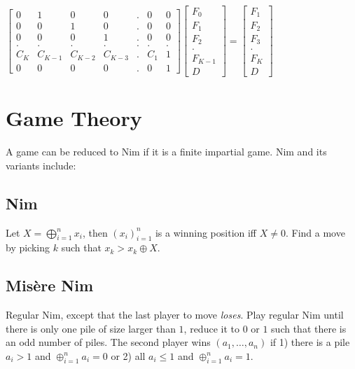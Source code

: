 \begin{enumerate}[label=(\roman*)]
    {
  \scriptsize
  $\begin{bmatrix}
    0 & 1 & 0 & 0 & . & 0 & 0\\
    0 & 0 & 1 & 0 & . & 0 & 0\\
    0 & 0 & 0 & 1 & . & 0 & 0\\
    . & . & . & . & . & . & .\\
    C_K & C_{K-1} & C_{K-2} & C_{K-3} & . & C_{1} & 1\\
    0 & 0 & 0 & 0 & . & 0 & 1
  \end{bmatrix} 
  \begin{bmatrix}
  F_0\\
  F_1\\
  F_2\\
  .\\
  F_{K-1}\\
  D
  \end{bmatrix} =
  \begin{bmatrix}
    F_1\\
    F_2\\
    F_3\\
    .\\
    F_K\\
    D
  \end{bmatrix}$
}
\end{enumerate}
\section{Game Theory}
A game can be reduced to Nim if it is a finite impartial game.
Nim and its variants include:

\subsection{Nim}
	Let $X = \bigoplus_{i=1}^n x_i$, then $(x_i)_{i=1}^n$ is a winning position iff $X\neq 0$. Find a move by picking $k$ such that $x_k > x_k \oplus X$.
	
\subsection{Mis\`{e}re Nim} 
    Regular Nim, except that the last player to move \textit{loses}. Play regular Nim until there is only one pile of size larger than $1$, reduce it to $0$ or $1$ such that there is an odd number of piles. The second player wins $(a_1, \dots, a_n)$ if 1) there is a pile $a_i > 1$ and $\oplus_{i=1}^{n} a_i = 0$ or 2) all $a_i \leq 1$ and $\oplus_{i=1}^{n} a_i = 1$.

